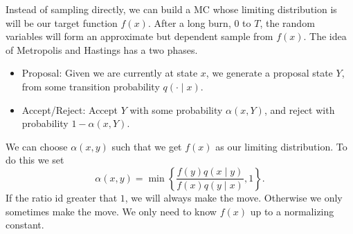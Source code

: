 Instead of sampling directly, we can build a MC whose limiting distribution is will be our target function $f(x)$. After a long burn, $0$ to $T$, the random variables will form an approximate but dependent sample from $f(x)$. The idea of Metropolis and Hastings has a two phases.
\begin{itemize}
    \item Proposal: Given we are currently at state $x$, we generate a proposal state $Y$, from some transition probability $q(\cdot  \mid x)$.
    \item Accept/Reject: Accept $Y$ with some probability $\alpha (x,Y)$, and reject with probability $1 - \alpha (x,Y)$.
\end{itemize}
We can choose $\alpha (x,y)$ such that we get $f(x)$ as our limiting distribution. To do this we set
\[
    \alpha (x,y) = \min \left\{
    \frac{f(y) q(x \mid y)}{f(x) q(y \mid x)} , 1
    \right\}.
\]
If the ratio id greater that $1$, we will always make the move. Otherwise we only sometimes make the move. We only need to know $f(x)$ up to a normalizing constant.


